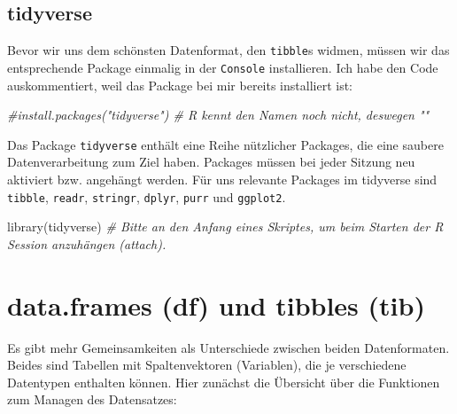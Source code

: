 \documentclass[
]{book}
\newenvironment{Shaded}{\begin{snugshade}}{\end{snugshade}}
\newcommand{\CommentTok}[1]{\textcolor[rgb]{0.56,0.35,0.01}{\textit{#1}}}
\newcommand{\FunctionTok}[1]{\textcolor[rgb]{0.00,0.00,0.00}{#1}}
\newcommand{\NormalTok}[1]{#1}
\theoremstyle{definition}
\theoremstyle{definition}
\theoremstyle{definition}
\theoremstyle{definition}
\theoremstyle{remark}
\begin{document}
\hypertarget{tidyverse}{%
\subsection{tidyverse}\label{tidyverse}}

Bevor wir uns dem schönsten Datenformat, den \texttt{tibble}s widmen, müssen wir das entsprechende Package einmalig in der \texttt{Console} installieren. Ich habe den Code auskommentiert, weil das Package bei mir bereits installiert ist:

\begin{Shaded}
\begin{Highlighting}[]
\CommentTok{\#install.packages("tidyverse")  \# R kennt den Namen noch nicht, deswegen ""}
\end{Highlighting}
\end{Shaded}

Das Package \texttt{tidyverse} enthält eine Reihe nützlicher Packages, die eine saubere Datenverarbeitung zum Ziel haben. Packages müssen bei jeder Sitzung neu aktiviert bzw. angehängt werden. Für uns relevante Packages im tidyverse sind \texttt{tibble}, \texttt{readr}, \texttt{stringr}, \texttt{dplyr}, \texttt{purr} und \texttt{ggplot2}.

\begin{Shaded}
\begin{Highlighting}[]
\FunctionTok{library}\NormalTok{(tidyverse)   }\CommentTok{\# Bitte an den Anfang eines Skriptes, um beim Starten der R Session anzuhängen (attach).}
\end{Highlighting}
\end{Shaded}

\hypertarget{data.frames-df-und-tibbles-tib}{%
\section{data.frames (df) und tibbles (tib)}\label{data.frames-df-und-tibbles-tib}}

Es gibt mehr Gemeinsamkeiten als Unterschiede zwischen beiden Datenformaten. Beides sind Tabellen mit Spaltenvektoren (Variablen), die je verschiedene Datentypen enthalten können. Hier zunächst die Übersicht über die Funktionen zum Managen des Datensatzes:
\end{document}
